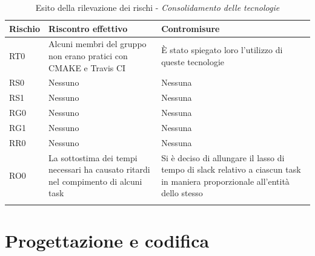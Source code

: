 \documentclass[./PianodiProgetto.tex]{subfiles}
\begin{document}
\begin{longtable}{|p{15mm}|p{60mm}|p{60mm}|}
	\hline \textbf{Rischio} & \textbf{Riscontro effettivo} & \textbf{Contromisure} \\
	
	\hline RT0 & Alcuni membri del gruppo non erano pratici con CMAKE e Travis CI &  È stato spiegato loro l'utilizzo di queste tecnologie \\
	
	\hline RS0 & Nessuno & Nessuna \\
	
	\hline RS1 & Nessuno & Nessuna \\
	
	\hline RG0 & Nessuno & Nessuna \\
	
	\hline RG1 & Nessuno & Nessuna \\
	
	\hline RR0 & Nessuno & Nessuna \\
	
	\hline RO0 & La sottostima dei tempi necessari ha causato ritardi nel compimento di alcuni task & Si è deciso di allungare il lasso di tempo di slack relativo a ciascun task in maniera proporzionale all'entità dello stesso \\
	
	\hline
	\caption{Esito della rilevazione dei rischi - \textit{Consolidamento delle tecnologie}}
\end{longtable}

\section{Progettazione e codifica}

\setlength\LTleft{-5.5mm}
\end{document}
